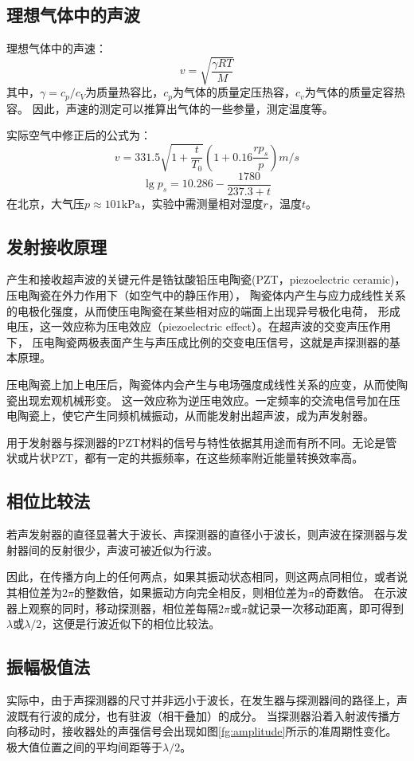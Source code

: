 \documentclass[UTF8,a4paper]{article}%
\begin{document}
\subsection{理想气体中的声波}
理想气体中的声速：
$$v=\sqrt{\frac{\gamma RT}{M}}$$
其中，$\gamma=c_p/c_V$为质量热容比，$c_p$为气体的质量定压热容，$c_v$为气体的质量定容热容。
因此，声速的测定可以推算出气体的一些参量，测定温度等。

实际空气中修正后的公式为：
$$v=331.5\sqrt{1+\frac{t}{T_0}}(1+0.16\frac{rp_s}{p})\unit{m/s}$$
$$\lg p_s=10.286-\frac{1780}{237.3+t}$$
在北京，大气压$p\approx 101\unit{\kilo\pascal}$，实验中需测量相对湿度$r$，温度$t$。
\subsection{发射接收原理}
产生和接收超声波的关键元件是锆钛酸铅压电陶瓷(PZT，piezoelectric ceramic)，压电陶瓷在外力作用下（如空气中的静压作用），
陶瓷体内产生与应力成线性关系的电极化强度，从而使压电陶瓷在某些相对应的端面上出现异号极化电荷，
形成电压，这一效应称为压电效应（piezoelectric effect）。在超声波的交变声压作用下，
压电陶瓷两极表面产生与声压成比例的交变电压信号，这就是声探测器的基本原理。

压电陶瓷上加上电压后，陶瓷体内会产生与电场强度成线性关系的应变，从而使陶瓷出现宏观机械形变。
这一效应称为逆压电效应。一定频率的交流电信号加在压电陶瓷上，使它产生同频机械振动，从而能发射出超声波，成为声发射器。

用于发射器与探测器的PZT材料的信号与特性依据其用途而有所不同。无论是管状或片状PZT，都有一定的共振频率，在这些频率附近能量转换效率高。
\subsection{相位比较法}
若声发射器的直径显著大于波长、声探测器的直径小于波长，则声波在探测器与发射器间的反射很少，声波可被近似为行波。

因此，在传播方向上的任何两点，如果其振动状态相同，则这两点同相位，或者说其相位差为$2\pi$的整数倍，如果振动方向完全相反，则相位差为$\pi$的奇数倍。
在示波器上观察的同时，移动探测器，相位差每隔$2\pi$或$\pi$就记录一次移动距离，即可得到$\lambda$或$\lambda/2$，这便是行波近似下的相位比较法。
\subsection{振幅极值法}
实际中，由于声探测器的尺寸并非远小于波长，在发生器与探测器间的路径上，声波既有行波的成分，也有驻波（相干叠加）的成分。
当探测器沿着入射波传播方向移动时，接收器处的声强信号会出现如图\ref{fg:amplitude}所示的准周期性变化。极大值位置之间的平均间距等于$\lambda/2$。
\end{document}

